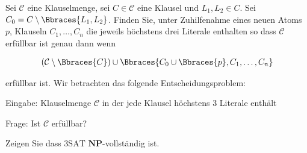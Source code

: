 
\begin{exercise}

Sei $\mathcal C$ eine Klauselmenge, sei $C \in \mathcal C$ eine Klausel und $L_1, L_2 \in C$.
Sei $C_0 = C \setminus \Bbraces{L_1, L_2}$.
Finden Sie, unter Zuhilfenahme eines neuen Atoms $p$, Klauseln $C_1, \dots, C_n$ die jeweils höchstens drei Literale enthalten so dass $\mathcal C$ erfüllbar ist genau dann wenn

\begin{align*}
    (\mathcal C \setminus \Bbraces{C})
    \cup
    \Bbraces{C_0 \cup \Bbraces{p}, C_1, \dots, C_n}
\end{align*}

erfüllbar ist.
Wir betrachten das folgende Entscheidungsproblem:

\begin{center}
    \begin{hetzlbox}[title = 3SAT]
        
        Eingabe:
        Klauselmenge $\mathcal C$ in der jede Klausel höchstens $3$ Literale enthält
    
        Frage:
        Ist $\mathcal C$ erfüllbar?
    
    \end{hetzlbox}    
\end{center}

Zeigen Sie dass $\mathrm{3SAT}$ $\mathbf{NP}$-vollständig ist.

\end{exercise}


